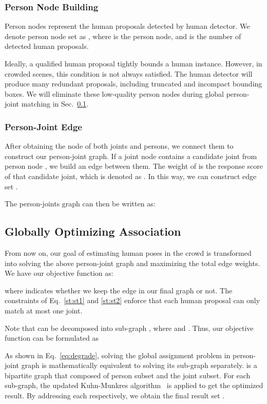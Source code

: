 \documentclass[10pt,twocolumn,letterpaper]{article}
\begin{document}
\vspace{-0.1in}
\subsubsection{Person Node Building}
Person nodes represent the human proposals detected by human detector. We denote person node set as , where  is the  person node, and  is the number of detected human proposals.

Ideally, a qualified human proposal tightly bounds a human instance. However, in crowded scenes, this condition is not always satisfied. The human detector will produce many redundant proposals, including truncated and incompact bounding boxes. We will eliminate these low-quality person nodes during global person-joint matching in Sec.~\ref{sec:optimize}.

\vspace{-0.1in}
\subsubsection{Person-Joint Edge} After obtaining the node of both joints and persons, we connect them to construct our person-joint graph. If a joint node  contains a candidate joint from person node , we build an edge  between them. The weight of  is the response score of that candidate joint, which is denoted as . In this way, we can construct edge set .


The person-joints graph can then be written as:


\subsection{Globally Optimizing Association} \label{sec:optimize}
From now on, our goal of estimating human poses in the crowd is transformed into solving the above person-joint graph and maximizing the total edge weights. We have our objective function as:

where  indicates whether we keep the edge  in our final graph or not. The constraints of Eq.~\ref{st:st1} and \ref{st:st2} enforce that each human proposal can only match at most one  joint.

Note that  can be decomposed into  sub-graph , where
 and .
Thus, our objective function can be formulated as


As shown in Eq.~\ref{eq:degrade}, solving the global assignment problem in person-joint graph  is mathematically equivalent to solving its sub-graph  separately.  is a bipartite graph that composed of person subset and the  joint subset. For each sub-graph, the updated Kuhn-Munkres algorithm~\cite{complexity} is applied to get the optimized result. By addressing each  respectively, we obtain the final result set .
\end{document}
